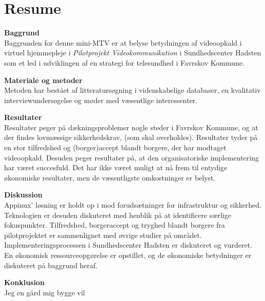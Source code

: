 \chapter{Resume}

\textbf{Baggrund}\\
Baggrunden for denne mini-MTV er at belyse betydningen af videoopkald i virtuel hjemmepleje i \textit{Pilotprojekt Videokommunikation} i Sundhedscenter Hadsten som et led i udviklingen af en strategi for telesundhed i Favrskov Kommune.

\textbf{Materiale og metoder}\\
Metoden har bestået af litteratursøgning i videnskabelige databaser, en kvalitativ interviewundersøgelse og møder med væsentlige interessenter.
 
\textbf{Resultater}\\
Resultater peger på dækningsproblemer nogle steder i Favrskov Kommune, og at der findes lovmæssige sikkerhedskrav, (som skal overholdes). Resultater tyder på en stor tilfredshed og (borger)accept blandt borgere, der har modtaget videoopkald. Desuden peger resultater på, at den organisatoriske implementering har været succesfuld. Det har ikke været muligt at nå frem til entydige økonomiske resultater, men de væsentligste omkostninger er belyst. 

\textbf{Diskussion}\\
Appinux’ løsning er holdt op i mod forudsætninger for infrastruktur og sikkerhed. Teknologien er desuden diskuteret med henblik på at identificere særlige fokuspunkter. Tilfredshed, borgeraccept og tryghed blandt borgere fra pilotprojektet er sammenlignet med øvrige studier på området. Implementeringsprocessen i Sundhedscenter Hadsten er diskuteret og vurderet. En økonomisk ressourceopgørelse er opstillet, og de økonomiske betydninger er diskuteret på baggrund heraf.

\textbf{Konklusion}\\
Jeg en gård mig bygge vil
